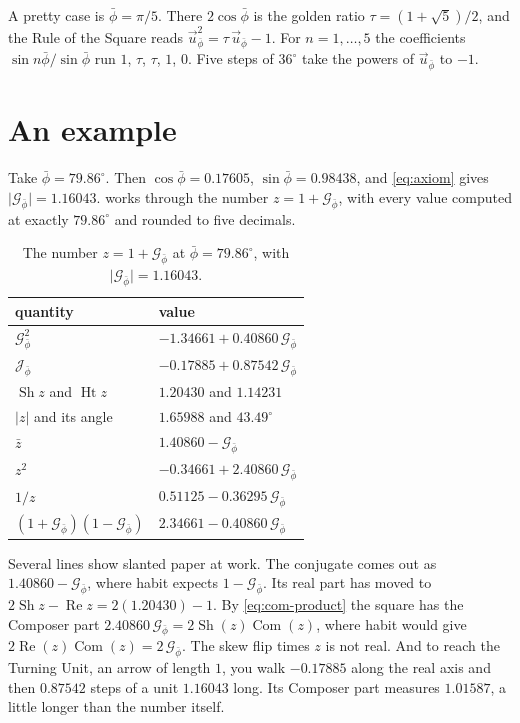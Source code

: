 \documentclass[11pt,a4paper]{article}
\theoremstyle{plain}
\theoremstyle{definition}
\newcommand{\pb}{\bar{\phi}}                     %
\newcommand{\Gp}{\mathcal{G}_{\bar{\phi}}}       %
\newcommand{\up}{\vec{u}_{\bar{\phi}}}           %
\newcommand{\Jp}{\mathcal{J}_{\bar{\phi}}}       %
\newcommand{\G}{\lvert\Gp\rvert}                 %
\renewcommand{\Re}{\operatorname{Re}}
\DeclareMathOperator{\Com}{Com}
\DeclareMathOperator{\Sh}{Sh}
\DeclareMathOperator{\Ht}{Ht}
\begin{document}
A pretty case is $\pb = \pi/5$. There $2\cos\pb$ is the golden ratio $\tau = (1 + \sqrt 5)/2$, and the Rule of the Square reads $\up^2 = \tau\,\up - 1$. For $n = 1, \dots, 5$ the coefficients $\sin n\pb/\sin\pb$ run $1$, $\tau$, $\tau$, $1$, $0$. Five steps of $36^\circ$ take the powers of $\up$ to $-1$.

\section{An example}\label{sec:example}

Take $\pb = 79.86^\circ$. Then $\cos\pb = 0.17605$, $\sin\pb = 0.98438$, and \eqref{eq:axiom} gives $\G = 1.16043$.  works through the number $z = 1 + \Gp$, with every value computed at exactly $79.86^\circ$ and rounded to five decimals.

\begin{table}[tb]
\centering
\small
\renewcommand{\arraystretch}{1.2}
\begin{tabular}{@{}l l@{}}
\toprule
\textbf{quantity} & \textbf{value} \\
\midrule
$\Gp^2$ & $-1.34661 + 0.40860\,\Gp$ \\
$\Jp$ & $-0.17885 + 0.87542\,\Gp$ \\
$\Sh z$ and $\Ht z$ & $1.20430$ and $1.14231$ \\
$\lvert z\rvert$ and its angle & $1.65988$ and $43.49^\circ$ \\
$\bar z$ & $1.40860 - \Gp$ \\
$z^2$ & $-0.34661 + 2.40860\,\Gp$ \\
$1/z$ & $0.51125 - 0.36295\,\Gp$ \\
$(1 + \Gp)(1 - \Gp)$ & $2.34661 - 0.40860\,\Gp$ \\
\bottomrule
\end{tabular}
\caption{The number $z = 1 + \Gp$ at $\pb = 79.86^\circ$, with $\G = 1.16043$.}
\label{tab:example}
\end{table}

Several lines show slanted paper at work. The conjugate comes out as $1.40860 - \Gp$, where habit expects $1 - \Gp$. Its real part has moved to $2\Sh z - \Re z = 2(1.20430) - 1$. By \eqref{eq:com-product} the square has the Composer part $2.40860\,\Gp = 2\Sh(z)\Com(z)$, where habit would give $2\Re(z)\Com(z) = 2\,\Gp$. The skew flip times $z$ is not real. And to reach the Turning Unit, an arrow of length $1$, you walk $-0.17885$ along the real axis and then $0.87542$ steps of a unit $1.16043$ long. Its Composer part measures $1.01587$, a little longer than the number itself.
\end{document}
